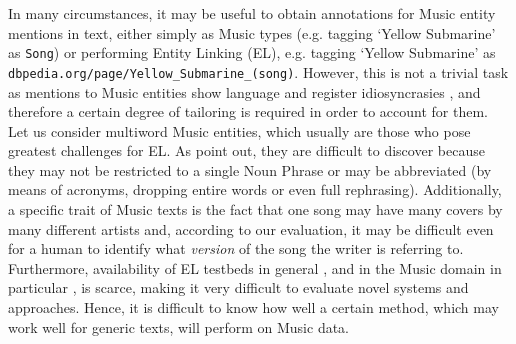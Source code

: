 In many circumstances, it may be useful to obtain annotations for Music entity mentions in text, either simply as Music types (e.g. tagging `Yellow Submarine' as \texttt{Song}) or performing Entity Linking (EL), e.g. tagging `Yellow Submarine' as \texttt{dbpedia.org/page/Yellow\_Submarine\_(song)}. However, this is not a trivial task as mentions to Music entities show language and register idiosyncrasies \cite{TataandDiEugenio2010,Gruhl2009}, and therefore a certain degree of tailoring is required in order to account for them. Let us consider multiword Music entities, which usually are those who pose greatest challenges for EL. As \cite{TataandDiEugenio2010} point out, they are difficult to discover because they may not be restricted to a single Noun Phrase or may be abbreviated (by means of acronyms, dropping entire words or even full rephrasing). Additionally, a specific trait of Music texts is the fact that one song may have many covers by many different artists and, according to our evaluation, it may be difficult even for a human to identify what \textit{version} of the song the writer is referring to. Furthermore, availability of EL testbeds in general \cite{Usbeck2015}, and in the Music domain in particular \cite{Gruhl2009}, is scarce, making it very difficult to evaluate novel systems and approaches. Hence, it is difficult to know how well a certain method, which may work well for generic texts, will perform on Music data.



